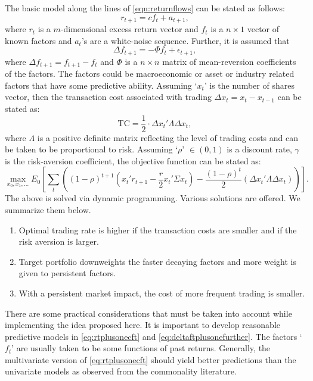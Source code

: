 The basic model along the lines of \eqref{eqn:returnflows} can be stated as follows:
	\begin{equation} \label{eq:rtplusonecft}
	r_{t+1}= c f_t + a_{t+1},
	\end{equation}
where $r_t$ is a $m$-dimensional excess return vector and $f_t$ is a $n \times 1$ vector of known factors and $a_t$'s are a white-noise sequence. Further, it is assumed that
	\begin{equation} \label{eq:deltaftplusonefurther}
	\Delta f_{t+1}= -\Phi f_t + \epsilon_{t+1},
	\end{equation}
where $\Delta f_{t+1}= f_{t+1} - f_t$ and $\Phi$ is a $n \times n$ matrix of mean-reversion coefficients of the factors. The factors could be macroeconomic or asset or industry related factors that have some predictive ability. Assuming `$x_t$' is the number of shares vector, then the transaction cost associated with trading $\Delta x_t= x_t - x_{t-1}$ can be stated as:
	\begin{equation} \label{eq:tceqhalf}
	\text{TC}= \dfrac{1}{2} \cdot \Delta x_t' \Lambda \Delta x_t,
	\end{equation}
where $\Lambda$ is a positive definite matrix reflecting the level of trading costs and can be taken to be proportional to risk. Assuming `$\rho$' $\in (0,1)$ is a discount rate, $\gamma$ is the risk-aversion coefficient, the objective function can be stated as:
	\begin{equation} \label{eq:objectivefunction}
	\max_{x_0,x_1,\ldots} E_0 \left[ \sum_t \left( (1-\rho)^{t+1} \left( x_t' r_{t+1} - \frac{r}{2} x_t' \Sigma x_t \right) - \dfrac{(1-\rho)^t}{2} (\Delta x_t' \Lambda \Delta x_t) \right) \right].
	\end{equation}
The above is solved via dynamic programming. Various solutions are offered. We summarize them below. 


\begin{enumerate}[--]
\item Optimal trading rate is higher if the transaction costs are smaller and if the risk aversion is larger.
\item Target portfolio downweights the faster decaying factors and more weight is given to persistent factors.
\item With a persistent market impact, the cost of more frequent trading is smaller. 
\end{enumerate}


There are some practical considerations that must be taken into account while implementing the idea proposed here. It is important to develop reasonable predictive models in \eqref{eq:rtplusonecft} and \eqref{eq:deltaftplusonefurther}. The factors `$f_t$' are usually taken to be some functions of past returns. Generally, the multivariate version of \eqref{eq:rtplusonecft} should yield better predictions than the univariate models as observed from the commonality literature. \twomedskip


